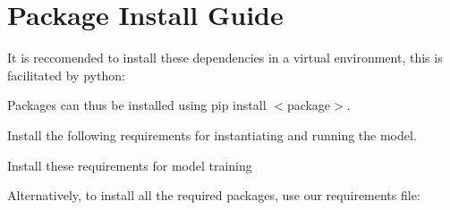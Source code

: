 \chapter{Package Install Guide}
\hypertarget{md_guides_2packages}{}\label{md_guides_2packages}
\label{md_guides_2packages_autotoc_md13}%
%


It is reccomended to install these dependencies in a virtual environment, this is facilitated by {\ttfamily python}\+:


\begin{DoxyCode}{0}

\end{DoxyCode}


Packages can thus be installed using {\ttfamily pip install \texorpdfstring{$<$}{<}package\texorpdfstring{$>$}{>}}.

Install the following requirements for instantiating and running the model.


\begin{DoxyCode}{0}

\end{DoxyCode}


Install these requirements for model training


\begin{DoxyCode}{0}

\end{DoxyCode}


Alternatively, to install all the required packages, use our requirements file\+:


\begin{DoxyCode}{0}

\end{DoxyCode}
 